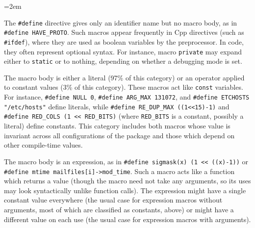 
\label{sec:categorization-details}

\begin{description}
  \sloppy
  \emergencystretch=2em

\item[Null define]  The {\tt \#define} directive gives only an
  identifier name but no macro body, as in {\tt \#define
  \verb|HAVE_PROTO|}\@.  Such macros appear frequently in Cpp
directives (such as {\tt \#ifdef}), where they are used as boolean
variables by the preprocessor.  In code, they often represent optional
syntax.  For instance,
macro {\tt private} may expand either to {\tt static} or to nothing,
depending on whether a debugging mode is set.

\item[Constant] The macro body is either a literal (97\% of this category)
  or an operator applied to constant values (3\% of this category).
  These macros act like {\tt const} variables. 
  For instance, {\tt \#define NULL 0}, {\tt \#define \verb|ARG_MAX|
  131072}, and {\tt \#define ETCHOSTS "/etc/hosts"} define literals, while
{\tt \#define \verb|RE_DUP_MAX| ((1<<15)-1)} and {\tt
\#define \verb|RED_COLS| (1 << \verb|RED_BITS|)} (where \verb|RED_BITS| is
a constant, possibly a literal) define constants.  This category includes
both macros whose value is invariant across all configurations of the
package and those which depend on other compile-time values.  

\item[Expression]  The macro body is an expression, as in {\tt \#define
  sigmask(x) (1 << ((x)-1))} or {\tt \#define mtime mailfiles[i]->\verb|mod_time|}.
Such a macro acts like a function which returns a value (though the
macro need not take any arguments, so its uses may look syntactically
unlike function calls). 
The expression might have a single constant value everywhere (the usual
case for expression macros without arguments, most of which are classified
as constants, above) or might have a different value on each use (the usual
case for expression macros with arguments).


\end{description}
